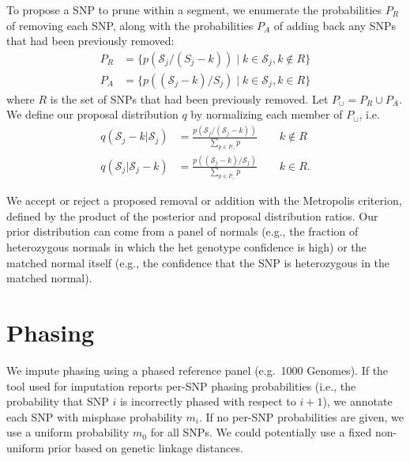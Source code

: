 \documentclass[10pt,letter]{article}
\numberwithin{equation}{section}
\newcommand{\rt}{\right}
\newcommand{\lt}{\left}
\begin{document}
To propose a SNP to prune within a segment, we enumerate the probabilities $P_R$ of removing each SNP, along with the probabilities $P_A$ of adding back any SNPs that had been previously removed:
\begin{align*}
P_R &= \{p(\mathcal{S}_j/(S_j - k))\mid k\in \mathcal{S}_j, k\notin R\}\\
P_A &= \{p((\mathcal{S}_j - k)/S_j)\mid k\in \mathcal{S}_j, k\in R\}
\end{align*}
where $R$ is the set of SNPs that had been previously removed. Let $P_{\cup}=P_R\cup P_A$. We define our proposal distribution $q$ by normalizing each member of $P_\cup$, i.e.
\begin{align*}
q(\mathcal{S}_j-k|\mathcal{S}_j) &= \frac{p(\mathcal{S}_j/(\mathcal{S}_j-k))}{\sum_{p\in P_\cup} p}\qquad k\notin R\\
q(\mathcal{S}_j|\mathcal{S}_j-k) &= \frac{p((\mathcal{S}_j-k)/\mathcal{S}_j)}{\sum_{p\in P_\cup} p}\qquad k\in R.
\end{align*}

We accept or reject a proposed removal or addition with the Metropolis criterion, defined by the product of the posterior and proposal distribution ratios. Our prior distribution can come from a panel of normals (e.g., the fraction of heterozygous normals in which the het genotype confidence is high) or the matched normal itself (e.g., the confidence that the SNP is heterozygous in the matched normal).


\section{Phasing}

We impute phasing using a phased reference panel (e.g.\ 1000 Genomes). If the tool used for imputation reports per-SNP phasing probabilities (i.e., the probability that SNP $i$ is incorrectly phased with respect to $i+1$), we annotate each SNP with misphase probability $m_i$. If no per-SNP probabilities are given, we use a uniform probability $m_0$ for all SNPs. We could potentially use a fixed non-uniform prior based on genetic linkage distances.
\end{document}
